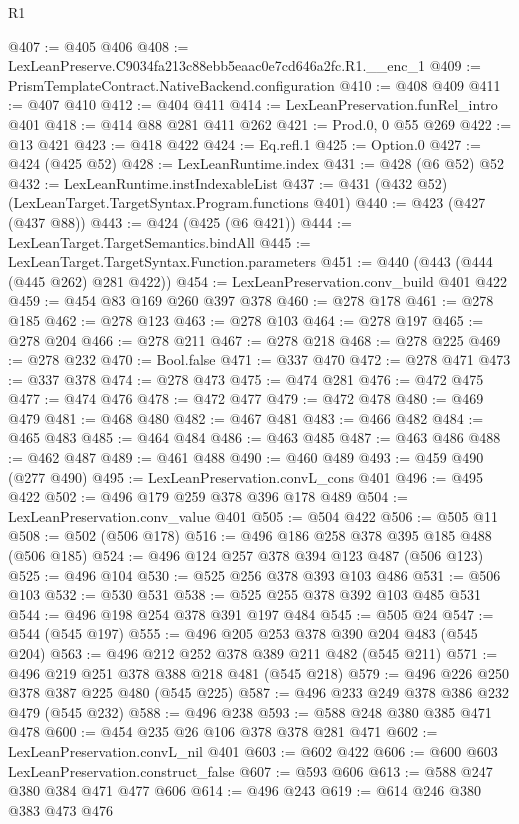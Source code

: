 \begin{lexlean}{R1}
\begin{coremodule}
@407 := @405 @406
@408 := LexLeanPreserve.C9034fa213c88ebb5eaac0e7cd646a2fc.R1.__enc_1
@409 := PrismTemplateContract.NativeBackend.configuration
@410 := @408 @409
@411 := @407 @410
@412 := @404 @411
@414 := LexLeanPreservation.funRel_intro @401
@418 := @414 @88 @281 @411 @262
@421 := Prod.{0, 0} @55 @269
@422 := @13 @421
@423 := @418 @422
@424 := Eq.refl.{1}
@425 := Option.{0}
@427 := @424 (@425 @52)
@428 := LexLeanRuntime.index
@431 := @428 (@6 @52) @52
@432 := LexLeanRuntime.instIndexableList
@437 := @431 (@432 @52) (LexLeanTarget.TargetSyntax.Program.functions @401)
@440 := @423 (@427 (@437 @88))
@443 := @424 (@425 (@6 @421))
@444 := LexLeanTarget.TargetSemantics.bindAll
@445 := LexLeanTarget.TargetSyntax.Function.parameters
@451 := @440 (@443 (@444 (@445 @262) @281 @422))
@454 := LexLeanPreservation.conv_build @401 @422
@459 := @454 @83 @169 @260 @397 @378
@460 := @278 @178
@461 := @278 @185
@462 := @278 @123
@463 := @278 @103
@464 := @278 @197
@465 := @278 @204
@466 := @278 @211
@467 := @278 @218
@468 := @278 @225
@469 := @278 @232
@470 := Bool.false
@471 := @337 @470
@472 := @278 @471
@473 := @337 @378
@474 := @278 @473
@475 := @474 @281
@476 := @472 @475
@477 := @474 @476
@478 := @472 @477
@479 := @472 @478
@480 := @469 @479
@481 := @468 @480
@482 := @467 @481
@483 := @466 @482
@484 := @465 @483
@485 := @464 @484
@486 := @463 @485
@487 := @463 @486
@488 := @462 @487
@489 := @461 @488
@490 := @460 @489
@493 := @459 @490 (@277 @490)
@495 := LexLeanPreservation.convL_cons @401
@496 := @495 @422
@502 := @496 @179 @259 @378 @396 @178 @489
@504 := LexLeanPreservation.conv_value @401
@505 := @504 @422
@506 := @505 @11
@508 := @502 (@506 @178)
@516 := @496 @186 @258 @378 @395 @185 @488 (@506 @185)
@524 := @496 @124 @257 @378 @394 @123 @487 (@506 @123)
@525 := @496 @104
@530 := @525 @256 @378 @393 @103 @486
@531 := @506 @103
@532 := @530 @531
@538 := @525 @255 @378 @392 @103 @485 @531
@544 := @496 @198 @254 @378 @391 @197 @484
@545 := @505 @24
@547 := @544 (@545 @197)
@555 := @496 @205 @253 @378 @390 @204 @483 (@545 @204)
@563 := @496 @212 @252 @378 @389 @211 @482 (@545 @211)
@571 := @496 @219 @251 @378 @388 @218 @481 (@545 @218)
@579 := @496 @226 @250 @378 @387 @225 @480 (@545 @225)
@587 := @496 @233 @249 @378 @386 @232 @479 (@545 @232)
@588 := @496 @238
@593 := @588 @248 @380 @385 @471 @478
@600 := @454 @235 @26 @106 @378 @378 @281 @471
@602 := LexLeanPreservation.convL_nil @401
@603 := @602 @422
@606 := @600 @603 LexLeanPreservation.construct_false
@607 := @593 @606
@613 := @588 @247 @380 @384 @471 @477 @606
@614 := @496 @243
@619 := @614 @246 @380 @383 @473 @476

\end{coremodule}
\end{lexlean}
